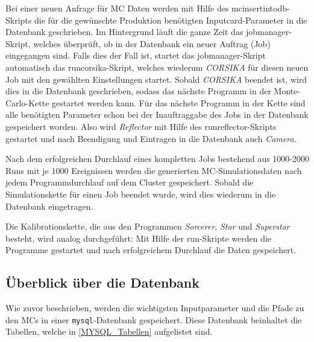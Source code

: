 Bei einer neuen Anfrage für MC Daten werden mit Hilfe des mcinsertintodb-Skripts die für die gewünschte Produktion benötigten Inputcard-Parameter in die Datenbank geschrieben.
Im Hintergrund läuft die ganze Zeit das jobmanager-Skript, welches überprüft, ob in der Datenbank ein neuer Auftrag (Job) eingegangen sind.
Falls dies der Fall ist, startet das jobmanager-Skript automatisch das runcorsika-Skript, welches wiederum \textit{CORSIKA} für diesen neuen Job mit den gewählten Einstellungen startet.
Sobald \textit{CORSIKA} beendet ist, wird dies in die Datenbank geschrieben, sodass das nächste Programm in der Monte-Carlo-Kette gestartet werden kann.
Für das nächste Programm in der Kette sind alle benötigten Parameter schon bei der Inauftraggabe des Jobs in der Datenbank gespeichert worden.
Also wird \textit{Reflector} mit Hilfe des runreflector-Skripts gestartet und nach Beendigung und Eintragen in die Datenbank auch \textit{Camera}.

Nach dem erfolgreichen Durchlauf eines kompletten Jobs  bestehend aus 1000-2000 Runs mit je 1000 Ereignissen werden die generierten MC-Simulationsdaten nach jedem Programmdurchlauf auf dem Cluster gespeichert.
Sobald die Simulationskette für einen Job beendet wurde, wird dies wiederum in die Datenbank eingetragen.

Die Kalibrationskette, die aus den Programmen \textit{Sorcerer}, \textit{Star} und \textit{Superstar} besteht, wird analog durchgeführt:
Mit Hilfe der run-Skripte werden die Programme gestartet und nach erfolgreichem Durchlauf die Daten gespeichert.

\subsection{Überblick über die Datenbank}
Wie zuvor beschrieben, werden die wichtigsten Inputparameter und die Pfade zu den MCs in einer \texttt{mysql}-Datenbank gespeichert.
Diese Datenbank beinhaltet die Tabellen, welche in \autoref{MYSQL_Tabellen} aufgelistet sind.

